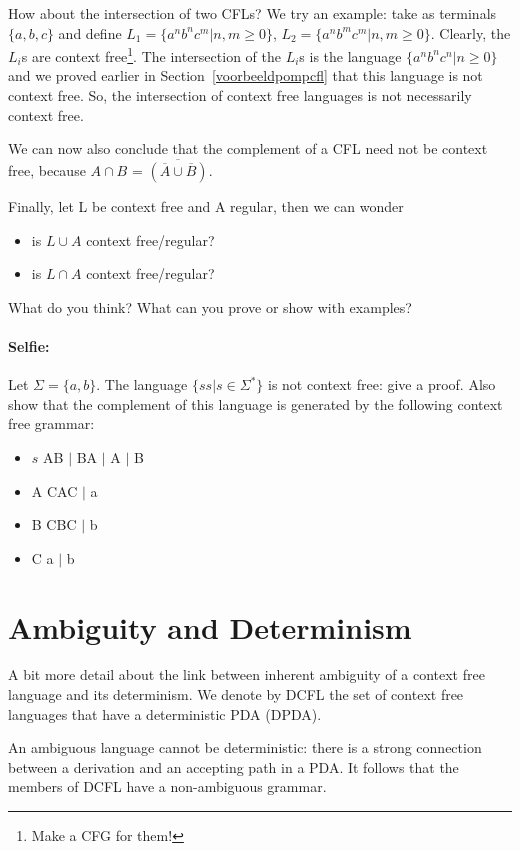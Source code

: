 How about the intersection of two CFLs? We try an example: take as
terminals $\{a,b,c\}$ and define $L_1 = \{a^nb^nc^m|n,m \geq 0\}$,
$L_2 = \{a^nb^mc^m|n,m \geq 0\}$. Clearly, the $L_i$s are context
free\footnote{Make a CFG for them!}. The intersection of the $L_i$s is
the language $\{a^nb^nc^n|n \geq 0\}$ and we proved earlier in
Section~\ref{voorbeeldpompcfl} that this language is not context
free. So, the intersection of context free languages is not
necessarily context free.

We can now also conclude that the complement of a CFL need not be
context free, because
%
$A \cap B$ = $\overline{(\overline{A} \cup \overline{B})}$.

Finally, let L be context free and A regular, then we can wonder

\begin{itemize}
\item is $L \cup A$ context free/regular?
\item is $L \cap A$ context free/regular?
\end{itemize}

What do you think? What can you prove or show with examples?

\paragraph{Selfie:} Let $\Sigma = \{a,b\}$.
The language $\{ss|s \in \Sigma^*\}$ is not context free: give a
proof. Also show that the \label{zelfdoen1} complement of this
language is generated by the following context free grammar:
\begin{itemize}
\item $s$ \rpijl AB $|$ BA $|$ A $|$ B
\item A \rpijl CAC $|$ a
\item B \rpijl CBC $|$ b
\item C \rpijl a $|$ b
\end{itemize}


\section{Ambiguity and Determinism}

A bit more detail about the link between inherent ambiguity of a
context free language and its determinism. We denote by DCFL the set of context free languages that have a deterministic PDA (DPDA).

An ambiguous language cannot be deterministic: there is a strong
connection between a derivation and an accepting path in a PDA. It
follows that the members of DCFL have a non-ambiguous grammar.

